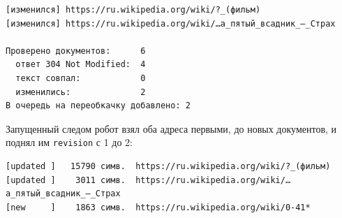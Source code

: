 \begin{verbatim}
[изменился] https://ru.wikipedia.org/wiki/?_(фильм)
[изменился] https://ru.wikipedia.org/wiki/…а_пятый_всадник_—_Страх

Проверено документов:      6
  ответ 304 Not Modified:  4
  текст совпал:            0
  изменились:              2
В очередь на переобкачку добавлено: 2
\end{verbatim}

Запущенный следом робот взял оба адреса первыми, до новых документов, и поднял
им \texttt{revision} с 1 до 2:

\begin{verbatim}
[updated ]   15790 симв.  https://ru.wikipedia.org/wiki/?_(фильм)
[updated ]    3011 симв.  https://ru.wikipedia.org/wiki/…а_пятый_всадник_—_Страх
[new     ]    1863 симв.  https://ru.wikipedia.org/wiki/0-41*
\end{verbatim}

\pagebreak
